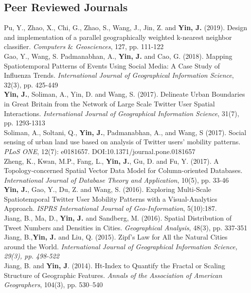 \documentclass[11pt, a4paper]{article}
\newcommand{\years}[1]{\marginnote{\scriptsize #1}}
\begin{document}
\subsection*{Peer Reviewed Journals}
\noindent
\years{2019} Pu, Y., Zhao, X., Chi, G., Zhao, S., Wang, J., Jin, Z. and \textbf{Yin, J.} (2019). Design and implementation of a parallel geographically weighted k-nearest neighbor classifier. \textit{Computers $\&$ Geosciences}, 127, pp. 111-122\\
\years{2018}Gao, Y., Wang, S. Padmanabhan, A., \textbf{Yin, J.} and Cao, G. (2018). Mapping Spatiotemporal Patterns of Events Using Social Media: A Case Study of Influenza Trends. \textit{International Journal of Geographical Information Science}, 32(3), pp. 425-449\\
\years{2017}\textbf{Yin, J.}, Soliman, A., Yin, D. and Wang, S. (2017). Delineate Urban Boundaries in Great Britain from the Network of Large Scale Twitter User Spatial Interactions. \textit{International Journal of Geographical Information Science}, 31(7), pp. 1293-1313\\
\years{2017} Soliman, A., Soltani, Q., \textbf{Yin, J.}, Padmanabhan, A., and Wang, S (2017). Social sensing of urban land use based on analysis of Twitter users' mobility patterns. \textit{PLoS ONE}, 12(7): e0181657. DOI:10.1371/journal.pone.0181657\\
\years{2017}Zheng, K., Kwan, M.P., Fang, L., \textbf{Yin, J.}, Gu, D. and Fu, Y. (2017). A Topology-concerned Spatial Vector Data Model for Column-oriented Databases. \textit{International Journal of Database Theory and Application}, 10(5), pp. 33-46\\
\years{2016}\textbf{Yin, J.}, Gao, Y., Du, Z. and Wang, S. (2016). Exploring Multi-Scale Spatiotemporal Twitter User Mobility Patterns with a Visual-Analytics Approach. \textit{ISPRS International Journal of Geo-Information}, 5(10):187.\\
\years{2016}Jiang, B., Ma, D., \textbf{Yin, J.} and Sandberg, M. (2016). Spatial Distribution of Tweet Numbers and Densities in Cities. \textit{Geographical Analysis}, 48(3), pp. 337-351\\
\years{2015}Jiang, B.,\textbf{Yin, J.} and Liu, Q. (2015). Zipf's Law for All the Natural Cities around the World. \textit{International Journal of Geographical Information Science, 29(3), pp. 498-522}\\
\years{2014}Jiang, B. and \textbf{Yin, J}. (2014). Ht-Index to Quantify the Fractal or Scaling Structure of Geographic Features. \textit{Annals of the Association of American Geographers}, 104(3), pp. 530–540\\
\end{document}
